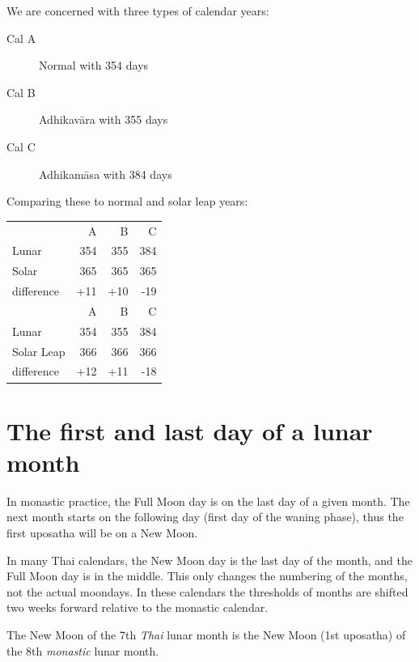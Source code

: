 \documentclass[11pt,oneside]{memoir-article}
\begin{document}
\begin{multicols}{2}

We are concerned with three types of calendar years:

\begin{description}
\item[{Cal A}] Normal with 354 days
\item[{Cal B}] Adhikavāra with 355 days
\item[{Cal C}] Adhikamāsa with 384 days
\end{description}

\columnbreak

Comparing these to normal and solar leap years:

\begin{center}
\begin{tabular}{lrrr}
 & A & B & C\\
Lunar & 354 & 355 & 384\\
Solar & 365 & 365 & 365\\
difference & +11 & +10 & -19\\
\hline
 & A & B & C\\
Lunar & 354 & 355 & 384\\
Solar Leap & 366 & 366 & 366\\
difference & +12 & +11 & -18\\
\end{tabular}
\end{center}

\end{multicols}

\section{The first and last day of a lunar month}
\label{sec-4-2}
\label{lunar-month-first-last}

In monastic practice, the Full Moon day is on the last day of a given
month. The next month starts on the following day (first day of the
waning phase), thus the first uposatha will be on a New Moon.

In many Thai calendars, the New Moon day is the last day of the month,
and the Full Moon day is in the middle. This only changes the
numbering of the months, not the actual moondays. In these calendars
the thresholds of months are shifted two weeks forward relative to the
monastic calendar.

The New Moon of the 7th \emph{Thai} lunar month is the New Moon (1st
uposatha) of the 8th \emph{monastic} lunar month.
\end{document}

